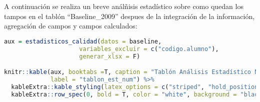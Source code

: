 A continuación se realiza un breve análñisis estadístico sobre como
quedan los tampos en el tablón ``Baseline\_2009'' despues de la
integración de la información, agregación de campos y campos calculados:

\begin{lstlisting}[language=R]
aux = estadisticos_calidad(datos = baseline,
                     variables_excluir = c("codigo.alumno"),
                     generar_xlsx = F)

knitr::kable(aux, booktabs =T, caption = "Tablón Análisis Estadístico Numérico",
             label = "tablon_est_num") %>%
  kableExtra::kable_styling(latex_options = c("striped", "hold_position", "scale_down")) %>%
  kableExtra::row_spec(0, bold = T, color = "white", background = "black", align = "c")
\end{lstlisting}



